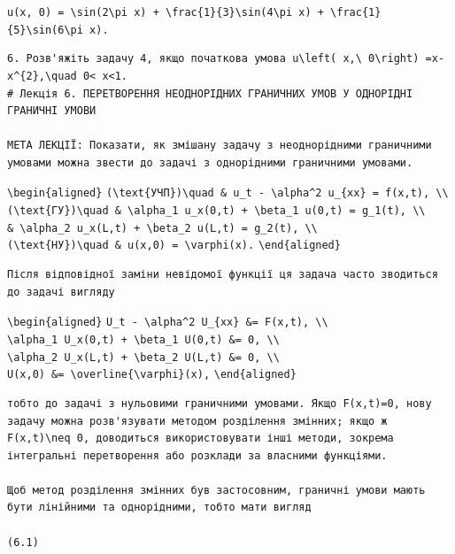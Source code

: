 \documentclass[
  ukrainian,
]{article}
\begin{document}
\texttt{u(x,\ 0)\ =\ \textbackslash{}sin(2\textbackslash{}pi\ x)\ +\ \textbackslash{}frac\{1\}\{3\}\textbackslash{}sin(4\textbackslash{}pi\ x)\ +\ \textbackslash{}frac\{1\}\{5\}\textbackslash{}sin(6\textbackslash{}pi\ x).}

\begin{verbatim}
6. Розв'яжіть задачу 4, якщо початкова умова u\left( x,\ 0\right) =x-x^{2},\quad 0< x<1. 
# Лекція 6. ПЕРЕТВОРЕННЯ НЕОДНОРІДНИХ ГРАНИЧНИХ УМОВ У ОДНОРІДНІ ГРАНИЧНІ УМОВИ

МЕТА ЛЕКЦІЇ: Показати, як змішану задачу з неоднорідними граничними умовами можна звести до задачі з однорідними граничними умовами.
\end{verbatim}

\texttt{\textbackslash{}begin\{aligned\}}
\texttt{(\textbackslash{}text\{УЧП\})\textbackslash{}quad\ \&\ u\_t\ -\ \textbackslash{}alpha\^{}2\ u\_\{xx\}\ =\ f(x,t),\ \textbackslash{}\textbackslash{}}
\texttt{(\textbackslash{}text\{ГУ\})\textbackslash{}quad\ \&\ \textbackslash{}alpha\_1\ u\_x(0,t)\ +\ \textbackslash{}beta\_1\ u(0,t)\ =\ g\_1(t),\ \textbackslash{}\textbackslash{}}
\texttt{\&\ \textbackslash{}alpha\_2\ u\_x(L,t)\ +\ \textbackslash{}beta\_2\ u(L,t)\ =\ g\_2(t),\ \textbackslash{}\textbackslash{}}
\texttt{(\textbackslash{}text\{НУ\})\textbackslash{}quad\ \&\ u(x,0)\ =\ \textbackslash{}varphi(x).}
\texttt{\textbackslash{}end\{aligned\}}

\begin{verbatim}
Після відповідної заміни невідомої функції ця задача часто зводиться до задачі вигляду
\end{verbatim}

\texttt{\textbackslash{}begin\{aligned\}}
\texttt{U\_t\ -\ \textbackslash{}alpha\^{}2\ U\_\{xx\}\ \&=\ F(x,t),\ \textbackslash{}\textbackslash{}}
\texttt{\textbackslash{}alpha\_1\ U\_x(0,t)\ +\ \textbackslash{}beta\_1\ U(0,t)\ \&=\ 0,\ \textbackslash{}\textbackslash{}}
\texttt{\textbackslash{}alpha\_2\ U\_x(L,t)\ +\ \textbackslash{}beta\_2\ U(L,t)\ \&=\ 0,\ \textbackslash{}\textbackslash{}}
\texttt{U(x,0)\ \&=\ \textbackslash{}overline\{\textbackslash{}varphi\}(x),}
\texttt{\textbackslash{}end\{aligned\}}

\begin{verbatim}
тобто до задачі з нульовими граничними умовами. Якщо F(x,t)=0, нову задачу можна розв'язувати методом розділення змінних; якщо ж F(x,t)\neq 0, доводиться використовувати інші методи, зокрема інтегральні перетворення або розклади за власними функціями.

Щоб метод розділення змінних був застосовним, граничні умови мають бути лінійними та однорідними, тобто мати вигляд

(6.1)
\end{verbatim}
\end{document}
